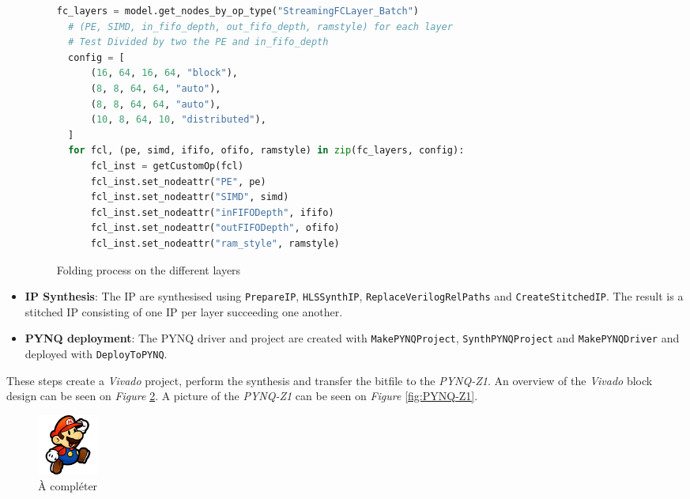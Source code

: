 \begin{itemize}
  \begin{figure}[htbp]
  \centering
  \begin{lstlisting}[language=Python]
  fc_layers = model.get_nodes_by_op_type("StreamingFCLayer_Batch")
  # (PE, SIMD, in_fifo_depth, out_fifo_depth, ramstyle) for each layer
  # Test Divided by two the PE and in_fifo_depth
  config = [
      (16, 64, 16, 64, "block"),
      (8, 8, 64, 64, "auto"),
      (8, 8, 64, 64, "auto"),
      (10, 8, 64, 10, "distributed"),
  ]
  for fcl, (pe, simd, ififo, ofifo, ramstyle) in zip(fc_layers, config):
      fcl_inst = getCustomOp(fcl)
      fcl_inst.set_nodeattr("PE", pe)
      fcl_inst.set_nodeattr("SIMD", simd)
      fcl_inst.set_nodeattr("inFIFODepth", ififo)
      fcl_inst.set_nodeattr("outFIFODepth", ofifo)
      fcl_inst.set_nodeattr("ram_style", ramstyle)
  \end{lstlisting}
  \caption[Folding Process]{Folding process on the different layers}
  	\label{fig:FoldingProcess}
  \end{figure}
  \item \textbf{IP Synthesis}: The IP are synthesised using \texttt{PrepareIP}, \texttt{HLSSynthIP}, \texttt{ReplaceVerilogRelPaths} and \texttt{CreateStitchedIP}. The result is a stitched IP consisting of one IP per layer succeeding one another.
  \item \textbf{PYNQ deployment}: The PYNQ driver and project are created with \texttt{MakePYNQProject}, \texttt{SynthPYNQProject} and \texttt{MakePYNQDriver} and deployed with \texttt{DeployToPYNQ}.
\end{itemize}



These steps create a \emph{Vivado} project, perform the synthesis and transfer the bitfile to the \emph{PYNQ-Z1}. An overview of the \emph{Vivado} block design can be seen on \emph{Figure} \ref{fig:VivadoBlockDesign}. A picture of the \emph{PYNQ-Z1} can be seen on \emph{Figure} \ref{fig:PYNQ-Z1}.

\begin{figure}[htbp]
	\centering
		\includegraphics[width=2cm]{Figures/Default.png}
	\caption[ToDo]{\`A compléter}
	\label{fig:VivadoBlockDesign}
\end{figure}

